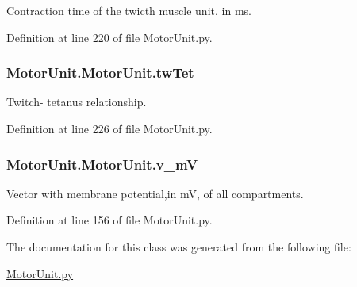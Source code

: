Contraction time of the twicth muscle unit, in ms. 



Definition at line 220 of file Motor\-Unit.\-py.

\hypertarget{class_motor_unit_1_1_motor_unit_a2a466c5f2f798901c1c438f9d57c2221}{
\subsubsection[{tw\-Tet}]{\setlength{\rightskip}{0pt plus 5cm}Motor\-Unit.\-Motor\-Unit.\-tw\-Tet}}\label{class_motor_unit_1_1_motor_unit_a2a466c5f2f798901c1c438f9d57c2221}


Twitch-\/ tetanus relationship. 



Definition at line 226 of file Motor\-Unit.\-py.

\hypertarget{class_motor_unit_1_1_motor_unit_aa8968f89250895ae2ae572e9106709f2}{
\subsubsection[{v\-\_\-m\-V}]{\setlength{\rightskip}{0pt plus 5cm}Motor\-Unit.\-Motor\-Unit.\-v\-\_\-m\-V}}\label{class_motor_unit_1_1_motor_unit_aa8968f89250895ae2ae572e9106709f2}


Vector with membrane potential,in m\-V, of all compartments. 



Definition at line 156 of file Motor\-Unit.\-py.



The documentation for this class was generated from the following file\-:\begin{DoxyCompactItemize}
\item 
\hyperlink{_motor_unit_8py}{Motor\-Unit.\-py}\end{DoxyCompactItemize}
